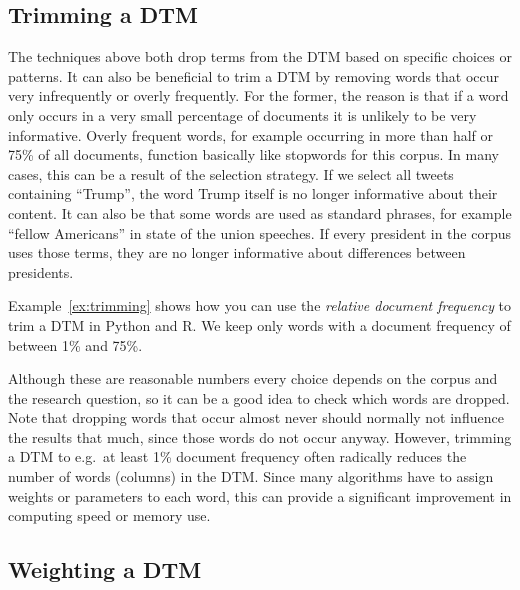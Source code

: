 \subsection{Trimming a DTM}

The techniques above both drop terms from the DTM based on specific choices or patterns.
It can also be beneficial to trim a DTM by removing words that occur very infrequently or overly frequently.
For the former, the reason is that if a word only occurs in a very small percentage of documents it is unlikely to be very informative.
Overly frequent words, for example occurring in more than half or 75\% of all documents, function basically like stopwords for this corpus.
In many cases, this can be a result of the selection strategy. If we select all tweets containing ``Trump'', the word Trump itself is no longer informative about their content.
It can also be that some words are used as standard phrases, for example ``fellow Americans'' in state of the union speeches.
If every president in the corpus uses those terms, they are no longer informative about differences between presidents.


Example~\ref{ex:trimming} shows how you can use the \emph{relative document frequency} to trim a DTM in Python and R.
We keep only words with a document frequency of between 1\% and 75\%.

Although these are reasonable numbers every choice depends on the corpus and the research question, so it can be a good idea to check which words are dropped.
Note that dropping words that occur almost never should normally not influence the results that much, since those words do not occur anyway.
However, trimming a DTM to e.g.\ at least 1\% document frequency often radically reduces the number of words (columns) in the DTM.
Since many algorithms have to assign weights or parameters to each word, this can provide a significant improvement in computing speed or memory use.

\subsection{Weighting a DTM}

